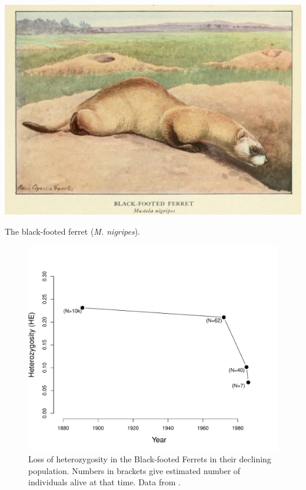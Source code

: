 \begin{marginfigure}[6cm]
\begin{center}
\includegraphics[width=\textwidth]{illustration_images/Genetic_drift/Black_footed_ferrets/Black_footed_ferret.pdf}
\end{center}
\caption{The black-footed ferret ({\it M. nigripes}). } \label{fig:black_footed_ferret}
\end{marginfigure}

\begin{figure}
\begin{center}
\includegraphics[width= \textwidth]{Journal_figs/genetic_drift/black_footed_ferrets/black_footed_ferrets_He.pdf}
\end{center}
\caption{Loss of heterozygosity in the Black-footed Ferrets in their declining population. Numbers in brackets give estimated number of individuals alive at that time. Data from \citet{Wisely:02}. } \label{fig:LossHet_ferrets}
\end{figure}

